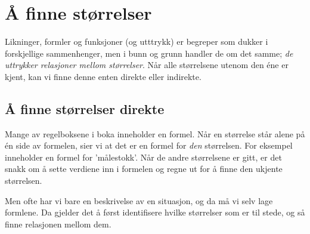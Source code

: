 



\section{Å finne størrelser}
Likninger, formler og funksjoner (og utttrykk) er begreper som dukker i forskjellige sammenhenger, men i bunn og grunn handler de om det samme; \textsl{de uttrykker relasjoner mellom størrelser}. Når alle størrelsene utenom den éne er kjent, kan vi finne denne enten direkte eller indirekte.\vsk

\subsection{Å finne størrelser direkte}
Mange av regelboksene i boka inneholder en formel. Når en størrelse står alene på én side av formelen, sier vi at det er en formel for \textsl{den} størrelsen. For eksempel inneholder  en formel for 'målestokk'. Når de andre størrelsene er gitt, er det snakk om å sette verdiene inn i formelen og regne ut for å finne den ukjente størrelsen.  \vsk

Men ofte har vi bare en beskrivelse av en situasjon, og da må vi selv lage formlene. Da gjelder det å først identifisere hvilke størrelser som er til stede, og så finne relasjonen mellom dem.\regv
{}
